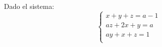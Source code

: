 \documentclass[addpoints,spanish, 12pt,a4paper]{exam}
\begin{document}
\begin{questions}
\question Dado el sistema: $$\left\{\begin{matrix}x + y + z = a - 1\\a z + 2 x + y = a\\a y + x + z = 1\\\end{matrix}\right.$$
\end{questions}
\end{document}

